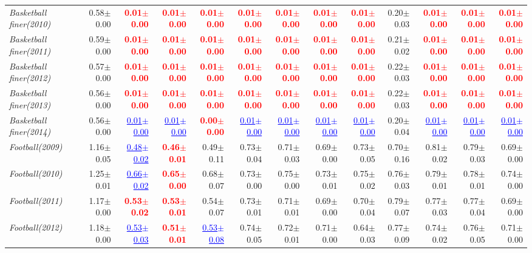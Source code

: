 \documentclass[nohyperref]{article}
\theoremstyle{plain}
\theoremstyle{definition}
\theoremstyle{remark}
\newcommand{\red}[1]{\textcolor{red}{\textbf{#1}}}
\newcommand{\blue}[1]{\textcolor{blue}{\underline{#1}}}
\begin{document}
\begin{table*}[!ht]
{\begin{tabular}{lrr|rrrrr|rrrrr}
			{\it Basketball finer(2010)} & 0.58$\pm$0.00 & \red{0.01$\pm$0.00} & \red{0.01$\pm$0.00} & \red{0.01$\pm$0.00} & \red{0.01$\pm$0.00} & \red{0.01$\pm$0.00} & \red{0.01$\pm$0.00} & \red{0.01$\pm$0.00} & 0.20$\pm$0.03 & \red{0.01$\pm$0.00} & \red{0.01$\pm$0.00} & \red{0.01$\pm$0.00} \\
			{\it Basketball finer(2011)} & 0.59$\pm$0.00 & \red{0.01$\pm$0.00} & \red{0.01$\pm$0.00} & \red{0.01$\pm$0.00} & \red{0.01$\pm$0.00} & \red{0.01$\pm$0.00} & \red{0.01$\pm$0.00} & \red{0.01$\pm$0.00} & 0.21$\pm$0.02 & \red{0.01$\pm$0.00} & \red{0.01$\pm$0.00} & \red{0.01$\pm$0.00} \\
			{\it Basketball finer(2012)} & 0.57$\pm$0.00 & \red{0.01$\pm$0.00} & \red{0.01$\pm$0.00} & \red{0.01$\pm$0.00} & \red{0.01$\pm$0.00} & \red{0.01$\pm$0.00} & \red{0.01$\pm$0.00} & \red{0.01$\pm$0.00} & 0.22$\pm$0.03 & \red{0.01$\pm$0.00} & \red{0.01$\pm$0.00} & \red{0.01$\pm$0.00} \\
			{\it Basketball finer(2013)} & 0.56$\pm$0.00 & \red{0.01$\pm$0.00} & \red{0.01$\pm$0.00} & \red{0.01$\pm$0.00} & \red{0.01$\pm$0.00} & \red{0.01$\pm$0.00} & \red{0.01$\pm$0.00} & \red{0.01$\pm$0.00} & 0.22$\pm$0.03 & \red{0.01$\pm$0.00} & \red{0.01$\pm$0.00} & \red{0.01$\pm$0.00} \\
			{\it Basketball finer(2014)} & 0.56$\pm$0.00 & \blue{0.01$\pm$0.00} & \blue{0.01$\pm$0.00} & \red{0.00$\pm$0.00} & \blue{0.01$\pm$0.00} & \blue{0.01$\pm$0.00} & \blue{0.01$\pm$0.00} & \blue{0.01$\pm$0.00} & 0.20$\pm$0.04 & \blue{0.01$\pm$0.00} & \blue{0.01$\pm$0.00} & \blue{0.01$\pm$0.00} \\
			{\it Football(2009)} & 1.16$\pm$0.05 & \blue{0.48$\pm$0.02} & \red{0.46$\pm$0.01} & 0.49$\pm$0.11 & 0.73$\pm$0.04 & 0.71$\pm$0.03 & 0.69$\pm$0.00 & 0.73$\pm$0.05 & 0.70$\pm$0.16 & 0.81$\pm$0.02 & 0.79$\pm$0.03 & 0.69$\pm$0.00 \\
			{\it Football(2010)} & 1.25$\pm$0.01 & \blue{0.66$\pm$0.02} & \red{0.65$\pm$0.00} & 0.68$\pm$0.07 & 0.73$\pm$0.00 & 0.75$\pm$0.00 & 0.73$\pm$0.01 & 0.75$\pm$0.02 & 0.76$\pm$0.03 & 0.79$\pm$0.01 & 0.78$\pm$0.01 & 0.74$\pm$0.00 \\
			{\it Football(2011)} & 1.17$\pm$0.00 & \red{0.53$\pm$0.02} & \red{0.53$\pm$0.01} & 0.54$\pm$0.07 & 0.73$\pm$0.01 & 0.71$\pm$0.01 & 0.69$\pm$0.00 & 0.70$\pm$0.04 & 0.79$\pm$0.07 & 0.77$\pm$0.03 & 0.77$\pm$0.04 & 0.69$\pm$0.00 \\
			{\it Football(2012)} & 1.18$\pm$0.00 & \blue{0.53$\pm$0.03} & \red{0.51$\pm$0.01} & \blue{0.53$\pm$0.08} & 0.74$\pm$0.05 & 0.72$\pm$0.01 & 0.71$\pm$0.00 & 0.64$\pm$0.03 & 0.77$\pm$0.09 & 0.74$\pm$0.02 & 0.76$\pm$0.05 & 0.71$\pm$0.00 \\

\end{tabular}}
\end{table*}
\end{document}
